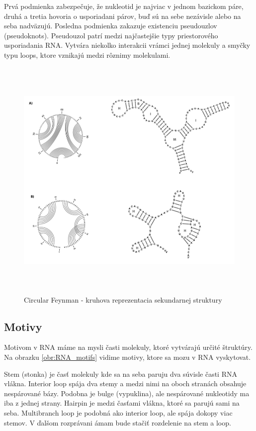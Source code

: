Prvá podmienka zabezpečuje, že nukleotid je najviac v jednom bazickom páre, druhá a tretia
hovoria o usporiadani párov, buď sú na sebe nezávisle alebo na seba nadväzujú.
Posledna podmienka zakazuje existenciu pseudouzlov (pseudoknots). Pseudouzol patrí medzi najčastejšie typy priestorového usporiadania RNA. Vytvára  niekolko interakcii vrámci jednej molekuly a smyčky typu loops,  ktore vznikajú medzi rôznimy molekulami.


\begin{figure}[H]
\centering
\includegraphics[width=140mm, height=120mm]{../img/RNA_circular_reprezentation.png}
\caption{Circular Feynman - kruhova reprezentacia sekundarnej struktury}
\label{obr:RNA_circular_representation}
\end{figure}


\subsection{Motivy}

Motivom v RNA máme na mysli časti molekuly, ktoré vytvárajú určité štruktúry.
Na obrazku \ref{obr:RNA_motifs} vidime motivy, ktore sa mozu v RNA vyskytovat.

Stem (stonka) je časť molekuly kde sa na seba paruju dva súvisle časti RNA vlákna.
Interior loop spája dva stemy a medzi nimi na oboch stranách obsahuje nespárované
bázy. Podobna je bulge (vypuklina), ale nespárované nukleotidy ma iba z jednej strany.
Hairpin je medzi časťami vlákna, ktoré sa parujú sami na seba.
Multibranch loop je podobná ako interior loop, ale spája dokopy viac stemov.
V ďalšom rozprávani ámam bude stačiť rozdelenie na stem a loop.

